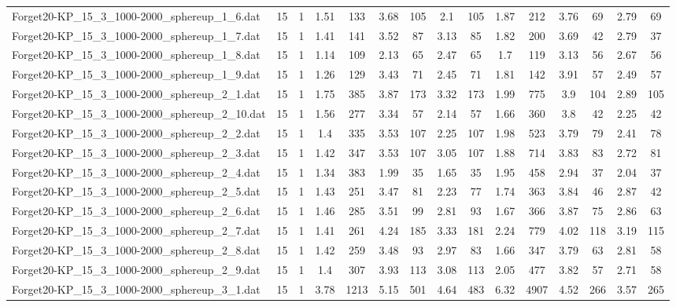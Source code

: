 \begin{table}[!ht]
{\begin{tabular}{lcccccccccccccc}
Forget20-KP\_15\_3\_1000-2000\_sphereup\_1\_6.dat & 15 & 1 & 1.51 & 133 & 3.68 & 105 & 2.1 & 105 & 1.87 & 212 & 3.76 & 69 & 2.79 & 69 \\
Forget20-KP\_15\_3\_1000-2000\_sphereup\_1\_7.dat & 15 & 1 & 1.41 & 141 & 3.52 & 87 & 3.13 & 85 & 1.82 & 200 & 3.69 & 42 & 2.79 & 37 \\
Forget20-KP\_15\_3\_1000-2000\_sphereup\_1\_8.dat & 15 & 1 & 1.14 & 109 & 2.13 & 65 & 2.47 & 65 & 1.7 & 119 & 3.13 & 56 & 2.67 & 56 \\
Forget20-KP\_15\_3\_1000-2000\_sphereup\_1\_9.dat & 15 & 1 & 1.26 & 129 & 3.43 & 71 & 2.45 & 71 & 1.81 & 142 & 3.91 & 57 & 2.49 & 57 \\
Forget20-KP\_15\_3\_1000-2000\_sphereup\_2\_1.dat & 15 & 1 & 1.75 & 385 & 3.87 & 173 & 3.32 & 173 & 1.99 & 775 & 3.9 & 104 & 2.89 & 105 \\
Forget20-KP\_15\_3\_1000-2000\_sphereup\_2\_10.dat & 15 & 1 & 1.56 & 277 & 3.34 & 57 & 2.14 & 57 & 1.66 & 360 & 3.8 & 42 & 2.25 & 42 \\
Forget20-KP\_15\_3\_1000-2000\_sphereup\_2\_2.dat & 15 & 1 & 1.4 & 335 & 3.53 & 107 & 2.25 & 107 & 1.98 & 523 & 3.79 & 79 & 2.41 & 78 \\
Forget20-KP\_15\_3\_1000-2000\_sphereup\_2\_3.dat & 15 & 1 & 1.42 & 347 & 3.53 & 107 & 3.05 & 107 & 1.88 & 714 & 3.83 & 83 & 2.72 & 81 \\
Forget20-KP\_15\_3\_1000-2000\_sphereup\_2\_4.dat & 15 & 1 & 1.34 & 383 & 1.99 & 35 & 1.65 & 35 & 1.95 & 458 & 2.94 & 37 & 2.04 & 37 \\
Forget20-KP\_15\_3\_1000-2000\_sphereup\_2\_5.dat & 15 & 1 & 1.43 & 251 & 3.47 & 81 & 2.23 & 77 & 1.74 & 363 & 3.84 & 46 & 2.87 & 42 \\
Forget20-KP\_15\_3\_1000-2000\_sphereup\_2\_6.dat & 15 & 1 & 1.46 & 285 & 3.51 & 99 & 2.81 & 93 & 1.67 & 366 & 3.87 & 75 & 2.86 & 63 \\
Forget20-KP\_15\_3\_1000-2000\_sphereup\_2\_7.dat & 15 & 1 & 1.41 & 261 & 4.24 & 185 & 3.33 & 181 & 2.24 & 779 & 4.02 & 118 & 3.19 & 115 \\
Forget20-KP\_15\_3\_1000-2000\_sphereup\_2\_8.dat & 15 & 1 & 1.42 & 259 & 3.48 & 93 & 2.97 & 83 & 1.66 & 347 & 3.79 & 63 & 2.81 & 58 \\
Forget20-KP\_15\_3\_1000-2000\_sphereup\_2\_9.dat & 15 & 1 & 1.4 & 307 & 3.93 & 113 & 3.08 & 113 & 2.05 & 477 & 3.82 & 57 & 2.71 & 58 \\
Forget20-KP\_15\_3\_1000-2000\_sphereup\_3\_1.dat & 15 & 1 & 3.78 & 1213 & 5.15 & 501 & 4.64 & 483 & 6.32 & 4907 & 4.52 & 266 & 3.57 & 265 \\

\end{tabular}}
\end{table}
